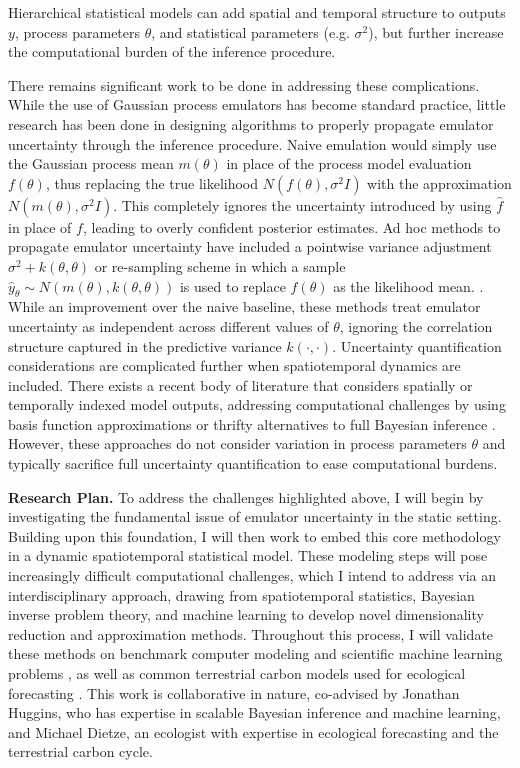 \documentclass[12pt]{article}
\begin{document}
Hierarchical statistical models can add spatial and temporal structure to outputs $y$, process parameters $\theta$, and statistical parameters (e.g. $\sigma^2$), but further increase the computational burden of the inference procedure. 
 
 There remains significant work to be done in addressing these complications. While the use of Gaussian process emulators has become standard practice, little research has been done in designing algorithms to properly propagate emulator uncertainty through the inference procedure. Naive emulation would simply use the Gaussian process mean $m(\theta)$ in place of the process model evaluation $f(\theta)$, thus replacing the true likelihood $N(f(\theta), \sigma^2 I)$
with the approximation $N(m(\theta), \sigma^2 I)$. This completely ignores the uncertainty introduced by using $\hat{f}$ in place of $f$, leading to overly confident posterior estimates. Ad hoc methods to propagate emulator uncertainty have included a pointwise variance adjustment 
$\sigma^2 + k(\theta, \theta)$ or re-sampling scheme in which a sample $\hat{y}_{\theta} \sim N(m(\theta), k(\theta, \theta))$ is used to replace $f(\theta)$ as the likelihood mean. \cite{Cleary, Fer}. While an improvement over the naive baseline, these methods treat emulator uncertainty as independent across different values of $\theta$, ignoring the correlation structure captured in the predictive variance $k(\cdot, \cdot)$. Uncertainty quantification considerations are complicated further when spatiotemporal dynamics are included. There exists a recent body of literature that considers spatially or temporally indexed model outputs, addressing computational challenges by using basis function approximations \cite{Fadikar} or thrifty alternatives to full Bayesian inference \cite{Sun}. However, these approaches do not consider variation in process parameters $\theta$ and typically sacrifice full uncertainty quantification to ease computational burdens. 

\noindent
\textbf{Research Plan.} To address the challenges highlighted above, I will begin by investigating the fundamental issue of emulator uncertainty in the 
static setting. Building upon this foundation, I will then work to embed this core methodology in a dynamic spatiotemporal statistical model. These modeling steps will pose increasingly difficult computational challenges, which I intend to address via an interdisciplinary approach, drawing from spatiotemporal statistics, Bayesian inverse problem theory, and machine learning to develop novel dimensionality reduction and approximation methods. Throughout this process, I will validate these methods on benchmark computer modeling and scientific machine learning problems \cite{Surjanovic, Takamoto}, as well as  common terrestrial carbon models used for ecological forecasting \cite{Dietze, Canadell}. This work is collaborative in nature, co-advised by Jonathan Huggins, who has expertise in scalable Bayesian inference and machine learning, and Michael Dietze, an ecologist with expertise in ecological forecasting and the terrestrial carbon cycle. 
 
\end{document}

